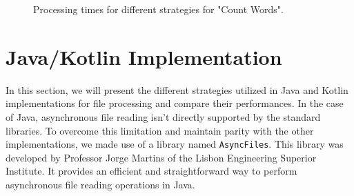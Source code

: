 \begin{table}[H]
    \centering
    \caption{Processing times for different strategies for "Count Words".}
    \label{tab:group_word_processing_times_cs}
\end{table}

\begin{figure}[H]
    \raggedright
    \caption{Processing times for different strategies for "Count Words".}
    \label{fig:group_word_processing_times_cs}
\end{figure}



\section{Java/Kotlin Implementation}
\label{sec:java_implementation}

In this section, we will present the different strategies utilized in Java and Kotlin implementations for file processing and compare their performances. In the case of Java, asynchronous file reading isn't directly supported by the standard libraries. To overcome this limitation and maintain parity with the other implementations, we made use of a library named \texttt{AsyncFiles}. This library was developed by Professor Jorge Martins of the Lisbon Engineering Superior Institute. It provides an efficient and straightforward way to perform asynchronous file reading operations in Java.


